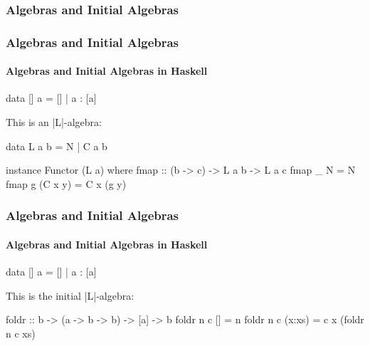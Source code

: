 \documentclass{beamer}
\DeclareMathOperator{\obj}{O}
\DeclareMathOperator{\mor}{M}
\newcommand{\func}[1]{\ensuremath{\mathsf{#1}}}
\newcommand{\funcO}[1]{\ensuremath{\func{#1}_{\obj}}}
\newcommand{\funcM}[1]{\ensuremath{\func{#1}_{\mor}}}
\DeclareMathOperator{\inmo}{in}
\newcommand{\cata}[1]{\ensuremath{\llparenthesis#1\rrparenthesis}}
\begin{document}
\begin{frame}
  \frametitle{Algebras and Initial Algebras}

  \begin{definition}
  \end{definition}
  \begin{center}
  \end{center}

\end{frame}


\begin{frame}[fragile]
  \frametitle{Algebras and Initial Algebras}
  \framesubtitle{Algebras and Initial Algebras in Haskell}

  \begin{example}
    \begin{code}
data [] a = [] | a : [a]
    \end{code}
    This is an |L|-algebra:
    \begin{code}
data L a b = N | C a b

instance Functor (L a) where
  fmap :: (b -> c) -> L a b -> L a c
  fmap _ N       = N
  fmap g (C x y) = C x (g y)
    \end{code}
  \end{example}

\end{frame}


\begin{frame}[fragile]
  \frametitle{Algebras and Initial Algebras}
  \framesubtitle{Algebras and Initial Algebras in Haskell}

  \begin{example}
    \begin{code}
data [] a = [] | a : [a]
    \end{code}
    This is the initial |L|-algebra:
    \begin{code}
foldr :: b -> (a -> b -> b) -> [a] -> b
foldr n c []     = n
foldr n c (x:xs) = c x (foldr n c xs)
    \end{code}
  \end{example}

\end{frame}
\end{document}
